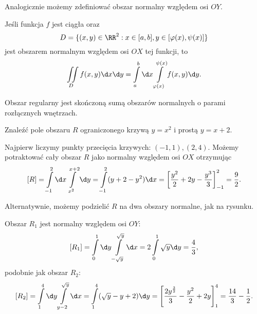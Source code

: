 Analogicznie możemy zdefiniować obszar normalny względem osi $OY$.

\begin{theorem}
    Jeśli funkcja $f$ jest ciągła oraz
    \[ D = \{(x, y) \in \RR^2 : x \in [a, b], y \in [\varphi(x), \psi(x)]\} \]
    jest obszarem normalnym względem osi $OX$ tej funkcji, to
    \[ \iint\limits_D f(x, y) \d x \d y = \int\limits_a^b \d x \int\limits_{\varphi(x)}^{\psi(x)} f(x, y) \d y. \]
\end{theorem}

\begin{definition}
    Obszar regularny jest skończoną sumą obszarów normalnych o parami rozłącznych wnętrzach.
\end{definition}

\begin{example}
    Znaleźć pole obszaru $R$ ograniczonego krzywą $y = x^2$ i prostą $y = x + 2$.
\end{example}
\begin{solution}
    Najpierw liczymy punkty przecięcia krzywych: $(-1, 1), (2, 4)$. Możemy potraktować cały obszar $R$ jako normalny względem osi $OX$ otrzymując
    \[ [R] = \int\limits_{-1}^2 \d x \int\limits_{x^2}^{x+2} \d y = \int\limits_{-1}^2 (y + 2 - y^2) \d x = \left[\frac{y^2}{2} + 2y - \frac{y^3}{3}\right]_{-1}^2 = \frac{9}{2}. \]

    Alternatywnie, możemy podzielić $R$ na dwa obszary normalne, jak na rysunku.
    \begin{center}
    \end{center}
    Obszar $R_1$ jest normalny względem osi $OY$:
    \[ [R_1] = \int\limits_0^1 \d y \int\limits_{-\sqrt{y}}^{\sqrt{y}} \d x = 2 \int\limits_0^1 \sqrt{y} \d y = \frac{4}{3}, \]
    podobnie jak obszar $R_2$:
    \[ [R_2] = \int\limits_1^4 \d y \int\limits_{y-2}^{\sqrt{y}} \d x = \int\limits_1^4 (\sqrt{y} - y + 2) \d y = \left[\frac{2y^{\frac{3}{2}}}{3} - \frac{y^2}{2} + 2y\right]_1^4 = \frac{14}{3} - \frac{1}{2}. \]
\end{solution}


